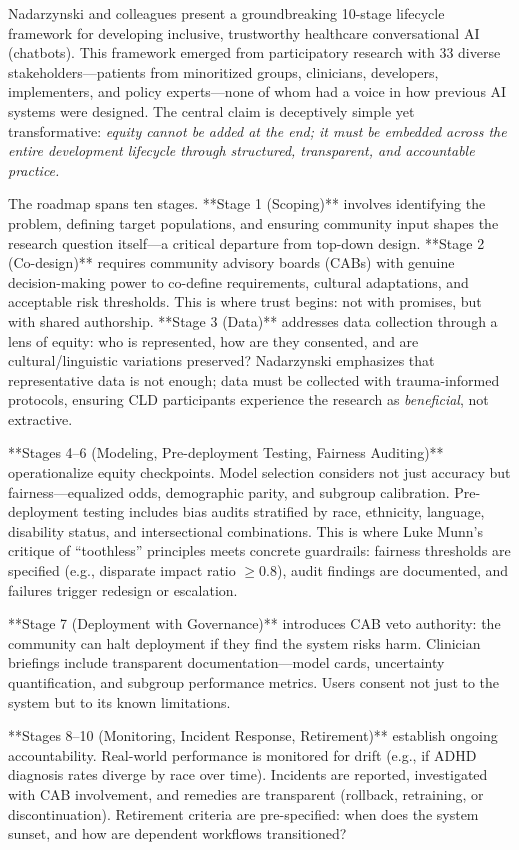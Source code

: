\documentclass[12pt,twoside]{article}
\begin{document}
Nadarzynski and colleagues present a groundbreaking 10-stage lifecycle framework for developing inclusive, trustworthy healthcare conversational AI (chatbots). This framework emerged from participatory research with 33 diverse stakeholders—patients from minoritized groups, clinicians, developers, implementers, and policy experts—none of whom had a voice in how previous AI systems were designed. The central claim is deceptively simple yet transformative: \emph{equity cannot be added at the end; it must be embedded across the entire development lifecycle through structured, transparent, and accountable practice.}

The roadmap spans ten stages. **Stage 1 (Scoping)** involves identifying the problem, defining target populations, and ensuring community input shapes the research question itself—a critical departure from top-down design. **Stage 2 (Co-design)** requires community advisory boards (CABs) with genuine decision-making power to co-define requirements, cultural adaptations, and acceptable risk thresholds. This is where trust begins: not with promises, but with shared authorship. **Stage 3 (Data)** addresses data collection through a lens of equity: who is represented, how are they consented, and are cultural/linguistic variations preserved? Nadarzynski emphasizes that representative data is not enough; data must be collected with trauma-informed protocols, ensuring CLD participants experience the research as \emph{beneficial}, not extractive.

**Stages 4–6 (Modeling, Pre-deployment Testing, Fairness Auditing)** operationalize equity checkpoints. Model selection considers not just accuracy but fairness—equalized odds, demographic parity, and subgroup calibration. Pre-deployment testing includes bias audits stratified by race, ethnicity, language, disability status, and intersectional combinations. This is where Luke Munn's critique of ``toothless'' principles meets concrete guardrails: fairness thresholds are specified (e.g., disparate impact ratio $\ge 0.8$), audit findings are documented, and failures trigger redesign or escalation.

**Stage 7 (Deployment with Governance)** introduces CAB veto authority: the community can halt deployment if they find the system risks harm. Clinician briefings include transparent documentation—model cards, uncertainty quantification, and subgroup performance metrics. Users consent not just to the system but to its known limitations.

**Stages 8–10 (Monitoring, Incident Response, Retirement)** establish ongoing accountability. Real-world performance is monitored for drift (e.g., if ADHD diagnosis rates diverge by race over time). Incidents are reported, investigated with CAB involvement, and remedies are transparent (rollback, retraining, or discontinuation). Retirement criteria are pre-specified: when does the system sunset, and how are dependent workflows transitioned?
\end{document}
